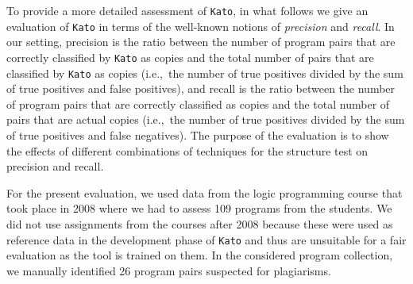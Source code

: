 \documentclass{tlp}
\newcommand{\iec}[0]{i.e.,\ }
\newcommand{\kato}[0]{\texttt{Kato}\xspace}
\begin{document}
To provide a more detailed assessment of \kato, 
in what follows we give an evaluation of \kato in terms of the well-known notions of  \emph{precision} and \emph{recall}.
In our setting,
precision is the ratio between the number of program pairs that are correctly classified by \kato as copies 
and the total number of 
pairs that are classified by \kato as copies (\iec the number of true positives divided by the sum of true positives and false positives), and
recall is the ratio between the number of program pairs that are correctly classified as copies and the total number of pairs that are 
actual copies (\iec the number of true positives divided by the sum of true positives and false negatives).
The purpose of the evaluation is to show the effects of different combinations of techniques for the structure test on precision and recall.

For the present evaluation, we used data from the 
logic programming course that took place in 2008 where we had to assess 109 programs from the students.
We did not use assignments from the courses after 2008 because these were used as reference data in the development phase of \kato and thus are 
unsuitable for a fair evaluation as the tool is trained on them.
In the considered program collection, we manually identified 26 program pairs suspected for plagiarisms.
\end{document}
